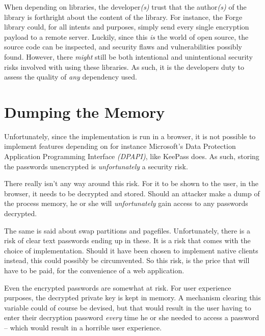 		When depending on libraries, the developer\emph{(s)} trust that the author\emph{(s)} of the library is forthright about the content of the library. For instance, the Forge library could, for all intents and purposes, simply send every single encryption payload to a remote server. Luckily, since this \emph{is} the world of open source, the source code can be inspected, and security flaws and vulnerabilities possibly found. However, there \emph{might} still be both intentional and unintentional security risks involved with using these libraries. As such, it is the developers duty to assess the quality of \emph{any} dependency used.

	\section{Dumping the Memory}
		Unfortunately, since the implementation is run in a browser, it is not possible to implement features depending on for instance Microsoft's Data Protection Application Programming Interface \emph{(DPAPI)}, like KeePass does. As such, storing the passwords unencrypted is \emph{unfortunately} a security risk.

		There really isn't any way around this risk. For it to be shown to the user, in the browser, it needs to be decrypted and stored. Should an attacker make a dump of the process memory, he or she will \emph{unfortunately} gain access to any passwords decrypted. 

		The same is said about swap partitions and pagefiles. Unfortunately, there is a risk of clear text passwords ending up in these. It is a risk that comes with the choice of implementation. Should it have been chosen to implement native clients instead, this could possibly be circumvented. So this risk, is the price that will have to be paid, for the convenience of a web application.

		Even the encrypted passwords are somewhat at risk. For user experience purposes, the decrypted private key is kept in memory. A mechanism clearing this variable could of course be devised, but that would result in the user having to enter their decryption password \emph{every} time he or she needed to access a password -- which would result in a horrible user experience.



